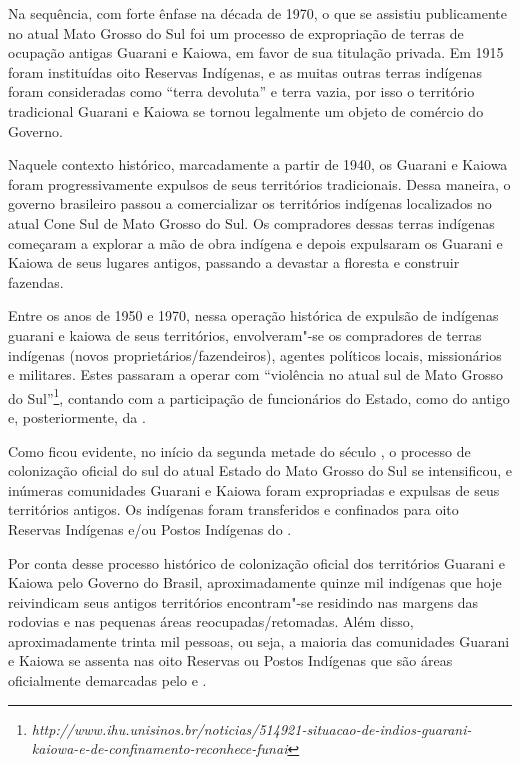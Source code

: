 Na sequência, com forte ênfase na década de 1970, o que se assistiu
publicamente no atual Mato Grosso do Sul foi um processo de
expropriação de terras de ocupação antigas Guarani e Kaiowa, em favor
de sua titulação privada. Em 1915 foram instituídas oito Reservas
Indígenas, e as muitas outras terras indígenas foram consideradas como
``terra devoluta'' e terra vazia, por isso o território tradicional
Guarani e Kaiowa se tornou legalmente um objeto de comércio do Governo.


Naquele contexto histórico, marcadamente a partir de 1940, os Guarani e
Kaiowa foram progressivamente expulsos de seus territórios
tradicionais. Dessa maneira, o governo brasileiro passou a
comercializar os territórios indígenas localizados no atual Cone Sul de
Mato Grosso do Sul. Os compradores dessas terras indígenas começaram a
explorar a mão de obra indígena e depois expulsaram os Guarani e Kaiowa
de seus lugares antigos, passando a devastar a floresta e construir
fazendas.

Entre os anos de 1950 e 1970, nessa operação histórica de expulsão de
indígenas guarani e kaiowa de seus territórios, envolveram"-se os
compradores de terras indígenas (novos proprietários/fazendeiros),
agentes políticos locais, missionários e militares. Estes passaram a
operar com ``violência no atual sul de Mato Grosso do Sul''\footnote{\emph{http://www.ihu.unisinos.br/noticias/514921-situacao-de-indios-guarani-kaiowa-e-de-confinamento-reconhece-funai}}, contando com a
participação de funcionários do Estado, como do antigo  e,
posteriormente, da . 

Como ficou evidente, no início da segunda metade do século , o
processo de colonização oficial do sul do atual Estado do Mato Grosso
do Sul se intensificou, e inúmeras comunidades Guarani e Kaiowa foram
expropriadas e expulsas de seus territórios antigos. Os indígenas foram
transferidos e confinados para oito Reservas Indígenas e/ou Postos
Indígenas do . 

Por conta desse processo histórico de colonização oficial dos
territórios Guarani e Kaiowa pelo Governo do Brasil, aproximadamente
quinze mil indígenas que hoje reivindicam seus antigos territórios
encontram"-se residindo nas margens das rodovias e nas pequenas áreas
reocupadas/retomadas. Além disso, aproximadamente trinta mil pessoas,
ou seja, a maioria das comunidades Guarani e Kaiowa se assenta nas oito
Reservas ou Postos Indígenas que são áreas oficialmente demarcadas pelo
 e . 

